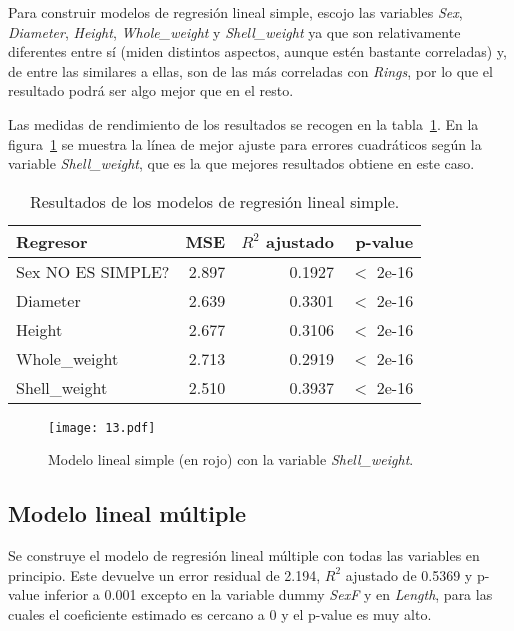 \documentclass[a4paper, 11pt]{article}
\begin{document}
Para construir modelos de regresión lineal simple, escojo las variables \textit{Sex}, \textit{Diameter}, \textit{Height}, \textit{Whole\_weight} y \textit{Shell\_weight} ya que son relativamente diferentes entre sí (miden distintos aspectos, aunque estén bastante correladas) y, de entre las similares a ellas, son de las más correladas con \textit{Rings}, por lo que el resultado podrá ser algo mejor que en el resto.

Las medidas de rendimiento de los resultados se recogen en la tabla~\ref{tbl:lmerr}. En la figura~\ref{fig:lmfit} se muestra la línea de mejor ajuste para errores cuadráticos según la variable \textit{Shell\_weight}, que es la que mejores resultados obtiene en este caso.

\begin{table}[ht]
  \caption{\label{tbl:lmerr}Resultados de los modelos de regresión lineal simple.}
  
  \begin{tabular}[c]{l||r|r|r}
    Regresor & MSE & $R^2$ ajustado & p-value \\
    \hline
    {\color{red}Sex NO ES SIMPLE?} & 2.897 & 0.1927 & $<$ 2e-16  \\
    Diameter & 2.639 & 0.3301 & $<$ 2e-16 \\
    Height & 2.677 & 0.3106 & $<$ 2e-16 \\
    Whole\_weight & 2.713 & 0.2919 & $<$ 2e-16 \\
    Shell\_weight & 2.510 & 0.3937 & $<$ 2e-16
  \end{tabular}
\end{table}


\begin{figure}
  \texttt{[image: 13.pdf]}
  \caption{\label{fig:lmfit}Modelo lineal simple (en rojo) con la variable \textit{Shell\_weight}.}
  
\end{figure}

\subsection{Modelo lineal múltiple}

Se construye el modelo de regresión lineal múltiple con todas las variables en principio. Este devuelve un error residual de 2.194, $R^2$ ajustado de 0.5369 y p-value inferior a 0.001 excepto en la variable dummy \textit{SexF} y en \textit{Length}, para las cuales el coeficiente estimado es cercano a 0 y el p-value es muy alto.
\end{document}
